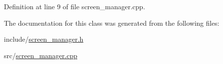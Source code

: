 Definition at line 9 of file screen\+\_\+manager.\+cpp.



The documentation for this class was generated from the following files\+:\begin{DoxyCompactItemize}
\item 
include/\hyperlink{screen__manager_8h}{screen\+\_\+manager.\+h}\item 
src/\hyperlink{screen__manager_8cpp}{screen\+\_\+manager.\+cpp}\end{DoxyCompactItemize}

